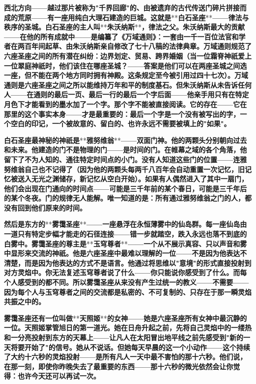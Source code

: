 \documentclass[12pt,a4paper,openany]{ctexbook}
\begin{document}
\textbf{西北方向——越过那片被称为"千界回廊"的、由被遗弃的古代传送门碎片拼接而成的荒原——有一座用纯白大理石建造的巨城。这就是}**\textbf{白石圣座}**\textbf{——律法与秩序的圣城。白石圣座的主人叫}**\textbf{朱沃纳斯}**\textbf{，律法之父。朱沃纳斯最大的贡献——在他的所有成就中——是编纂了《万域通则》：一套由一千一百位法官和学者在两百年间起草、由朱沃纳斯亲自修改了七十八稿的法律典章。万域通则规范了六座圣座之间的所有潜在纠纷：边界划定、贸易、跨界婚姻（当一位霜脊神祇爱上一位翠庭神祇时，他们该住在哪座圣城？——答案是他们可以在两座圣城之间选一座，但不能在两个地方同时拥有神殿。这条规定至今被引用过四十七次）。万域通则是六座圣座之间之所以能维持万年和平的制度基石。但朱沃纳斯从未告诉任何人——在通则的最后一页、最后一行的最后一个字后面——他亲手用只有在特定月色下才能看到的墨水加了一个字。那个字不能被直接阅读。它的存在——它在那里的这个事实本身——才是最重要的：最后一个字是一个没有被写出的字，一个空白的印记，一个被故意的、留白的、也许永远不需要被填上的"如果"。}


\textbf{白石圣座最神秘的神祇是}**\textbf{雅努维翁}**\textbf{——双面门神。他的两颗头分别朝向过去和未来。他建造的门不是物理的门——是时间的门。在帷幕之域的各个角落，他留下了不为人知的、通往特定时间点的小门。没有人知道这些门的位置——连雅努维翁自己也不记得了（因为他的两颗头每两千八百年会自动重置一次记忆，旧记忆被送入无光之渊储存，新记忆从空白开始）。如果有人偶然进入了其中一扇门，他们会出现在门通向的时间点——可能是三千年前的某个春日，可能是三千年后的某个冬夜。门的规律无人能解。唯一知道的是：所有通过雅努维翁之门的人，都没有回到他们原来的时间。}


\textbf{然后是东方的}**\textbf{雾霭圣座}**\textbf{——一座悬浮在永恒薄雾中的仙岛群。每一座仙岛由一道只有特定步幅才能走的石径连接——错一步就踏空，跌入永远也落不到底的白雾中。雾霭圣座的尊主是}**\textbf{玉穹尊者}**\textbf{——一个从不展示真容、只以声音和雾中显形来交流的神祇。他是六座圣座中最难以理解的一位——不是因为他表达不清楚，而是因为他表达的方式不是语言。他通过将思维以"意境"的形式直接投射到对方灵焰中。你无法复述玉穹尊者说了什么——你只能说你感受到了什么。而每个人感受到的都不同。所以雾霭圣座从来没有产生过统一的教义——不需要——因为每个人与玉穹尊者之间的交流都是私密的、不可复制的、只存在于那一瞬灵焰共振之中的。}


\textbf{雾霭圣座还有一位叫做}**\textbf{天照姬}**\textbf{的女神——她是六座圣座所有女神中最沉静的一位。天照姬掌管旭日的第一道光。她在日舟升起之前，先将自己灵焰中的一缕热和一分亮投射到东方的天幕上——让凡人在太阳冒出地平线之前先感受到"新的一天将要开始了"的信号。她从不说话。但她每天早晨的这一个小动作——这个持续了大约十六秒的灵焰投射——是所有凡人一天中最不害怕的那十六秒。他们说，在那一刻，即使你昨晚失去了最重要的东西——那十六秒的微光依然会让你觉得：也许今天还可以再试一次。}
\end{document}
